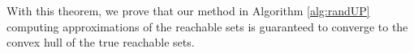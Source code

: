 \documentclass{article}
\begin{document}
%
%
%




With this theorem, we prove that our method in Algorithm \ref{alg:randUP} computing approximations of the reachable sets is guaranteed to converge to the convex hull of the true reachable sets.
\end{document}

